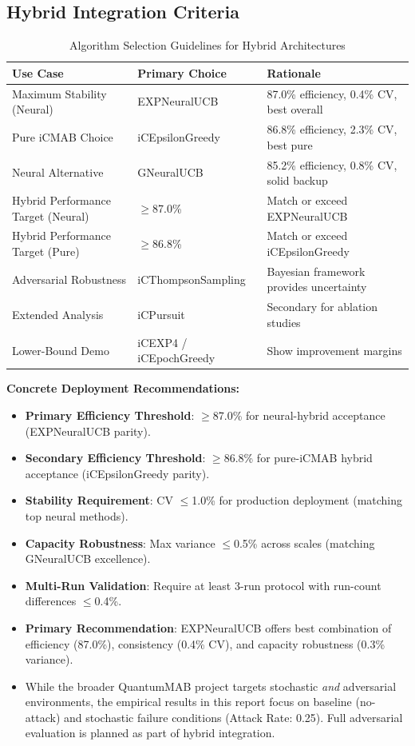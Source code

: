 \documentclass[12pt,a4paper]{article}
\begin{document}
\subsection{Hybrid Integration Criteria}

\begin{table}[H]
\centering
\caption{Algorithm Selection Guidelines for Hybrid Architectures}
\begin{tabular}{@{}lll@{}}
\toprule
\textbf{Use Case} & \textbf{Primary Choice} & \textbf{Rationale} \\
\midrule
Maximum Stability (Neural) & EXPNeuralUCB & 87.0\% efficiency, 0.4\% CV, best overall \\
Pure iCMAB Choice & iCEpsilonGreedy & 86.8\% efficiency, 2.3\% CV, best pure \\
Neural Alternative & GNeuralUCB & 85.2\% efficiency, 0.8\% CV, solid backup \\
Hybrid Performance Target (Neural) & $\geq$87.0\% & Match or exceed EXPNeuralUCB \\
Hybrid Performance Target (Pure) & $\geq$86.8\% & Match or exceed iCEpsilonGreedy \\
Adversarial Robustness & iCThompsonSampling & Bayesian framework provides uncertainty \\
Extended Analysis & iCPursuit & Secondary for ablation studies \\
Lower-Bound Demo & iCEXP4 / iCEpochGreedy & Show improvement margins \\
\bottomrule
\end{tabular}
\end{table}

\textbf{Concrete Deployment Recommendations:}
\begin{itemize}
\item \textbf{Primary Efficiency Threshold}: $\geq$87.0\% for neural-hybrid acceptance (EXPNeuralUCB parity).
\item \textbf{Secondary Efficiency Threshold}: $\geq$86.8\% for pure-iCMAB hybrid acceptance (iCEpsilonGreedy parity).
\item \textbf{Stability Requirement}: CV $\leq$1.0\% for production deployment (matching top neural methods).
\item \textbf{Capacity Robustness}: Max variance $\leq$0.5\% across scales (matching GNeuralUCB excellence).
\item \textbf{Multi-Run Validation}: Require at least 3-run protocol with run-count differences $\leq$0.4\%.
\item \textbf{Primary Recommendation}: EXPNeuralUCB offers best combination of efficiency (87.0\%), consistency (0.4\% CV), and capacity robustness (0.3\% variance).
\item While the broader QuantumMAB project targets stochastic \emph{and} adversarial environments, the empirical results in this report focus on baseline (no-attack) and stochastic failure conditions (Attack Rate: 0.25). Full adversarial evaluation is planned as part of hybrid integration.
\end{itemize}
\end{document}
